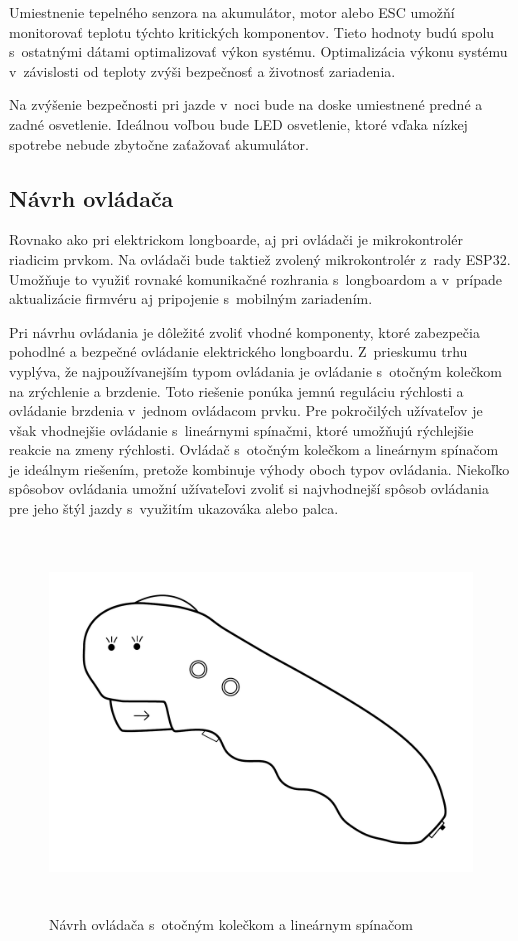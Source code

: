 Umiestnenie tepelného senzora na akumulátor, motor alebo ESC umožňí monitorovať teplotu týchto kritických komponentov.
Tieto hodnoty budú spolu s~ostatnými dátami optimalizovať výkon systému.
Optimalizácia výkonu systému v~závislosti od teploty zvýši bezpečnosť a životnosť zariadenia.

Na zvýšenie bezpečnosti pri jazde v~noci bude na doske umiestnené predné a zadné osvetlenie.
Ideálnou voľbou bude LED osvetlenie, ktoré vďaka nízkej spotrebe nebude zbytočne zaťažovať akumulátor.

\subsection{Návrh ovládača}

Rovnako ako pri elektrickom longboarde, aj pri ovládači je mikrokontrolér riadicim prvkom.
Na ovládači bude taktiež zvolený mikrokontrolér z~rady ESP32.
Umožňuje to využiť rovnaké komunikačné rozhrania s~longboardom a v~prípade aktualizácie firmvéru aj pripojenie s~mobilným zariadením.

Pri návrhu ovládania je dôležité zvoliť vhodné komponenty, ktoré zabezpečia pohodlné a bezpečné ovládanie elektrického longboardu.
Z~prieskumu trhu vyplýva, že najpoužívanejším typom ovládania je ovládanie s~otočným kolečkom na zrýchlenie a brzdenie.
Toto riešenie ponúka jemnú reguláciu rýchlosti a ovládanie brzdenia v~jednom ovládacom prvku.
Pre pokročilých užívateľov je však vhodnejšie ovládanie s~lineárnymi spínačmi, ktoré umožňujú rýchlejšie reakcie na zmeny rýchlosti.
Ovládač s~otočným kolečkom a lineárnym spínačom je ideálnym riešením, pretože kombinuje výhody oboch typov ovládania.
Niekoľko spôsobov ovládania umožní užívateľovi zvoliť si najvhodnejší spôsob ovládania pre jeho štýl jazdy s~využitím ukazováka alebo palca.

\begin{figure}
    \centering
    \includegraphics[height=10cm]{figures/controller.pdf}
    \caption{Návrh ovládača s~otočným kolečkom a lineárnym spínačom}\label{fig:remote-control}
\end{figure}

